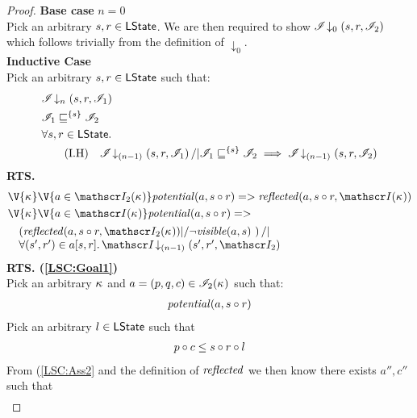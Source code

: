 \begin{lemma}
\begin{proof}
\noindent\textbf{Base case }$n=0$\\
Pick an arbitrary $s, r \in \textsf{LState}$. We are then required to show	$\mathscr{I} \!\downarrow_{0} \left(s, r, \mathscr{I}_2\right) $ which follows trivially from the definition of $\downarrow_0$.\\


\noindent\textbf{Inductive Case}\\
Pick an arbitrary $s, r \in \textsf{LState}$ such that:
\begin{align}
	&\extendsAMUpto{\lmod}{n}{s}{r}{\lmod_1} \label{LSC:Ass1}\\
	&\lmod_1 \weakenI{\{s\}} \lmod_2 \label{LSC:Ass2}\\
%		
	&	\for{s, r \in \LStates}  \nonumber\\
	& \tag{I.H} 
		\quad \extendsAMUpto{\lmod}{(n-1)}{s}{r}{\lmod_1} /| \lmod_1 \weakenI{\{s\}} \lmod_2 \implies \extendsAMUpto{\lmod}{(n-1)}{s}{r}{\lmod_2} \label{LSC:IH}
\end{align}
%
\textbf{RTS. } 
%
\begin{align}
	&\V{\ca{}}\V{a\in \lmod_2(\ca{})}
  \m{potential}(a,s \composeL r) =>
		\m{reflected}(a,s \composeL r, \lmod(\ca{})) \label{LSC:Goal1}\\
  &\V{\ca{}}\V{a\in \lmod (\ca{})}
  \m{potential}(a,s \composeL r) =>\null \nonumber \\
  & \quad
  \begin{array}{@{} l @{}}
		\left(\m{reflected}(a,s \composeL r, \lmod_2(\ca{})) |/ \neg\m{visible}(a,s) \ \right) /| \\
		\for{(s', r') \in a[s, r]} \extendsAMUpto{\lmod}{(n-1)}{s'}{r'}{\lmod_2}
 	\end{array} \label{LSC:Goal3}
\end{align}
%
\noindent\textbf{RTS. (\ref{LSC:Goal1})}\\
Pick an arbitrary $\kappa_{}$ and $a = (p, q, c) \in \mathscr{I}_2(\kappa_{})$ such that:
%
\begin{align*}
	\mathit{potential}(a, s \circ r) 
\end{align*}
%
Pick an arbitrary $l \in \textsf{LState}$ such that 
%
\begin{align}
	p \circ c \leq s \circ r \circ l\label{LSCG1:Ass8}
\end{align}
%
From (\ref{LSC:Ass2} and the definition of $\mathit{reflected}$ we then know there exists $a'', c''$ such that  
%
\begin{align*}

\end{align*}
\end{proof}
\end{lemma}
